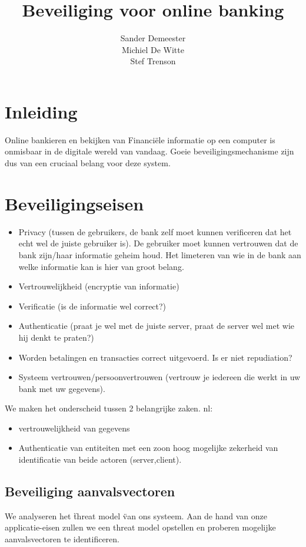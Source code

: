 \documentclass[11pt]{article}
\title{\textbf{Beveiliging voor online banking}}
\author{Sander Demeester\\
		Michiel De Witte\\
		Stef Trenson}
\date{}
\begin{document}
\maketitle

\section{Inleiding}
Online bankieren en bekijken van Financi\"ele informatie op een computer is onmisbaar in de digitale wereld van vandaag. Goeie beveiligingsmechanisme zijn dus van een cruciaal belang voor deze system. 

\section{Beveiligingseisen}
\begin{itemize}
\item Privacy (tussen de gebruikers, de bank zelf moet kunnen verificeren dat het echt wel de juiste gebruiker is). De gebruiker moet kunnen vertrouwen dat de bank zijn/haar informatie geheim houd. Het limeteren van wie in de bank aan welke informatie kan is hier van groot belang.
\item Vertrouwelijkheid (encryptie van informatie)
\item Verificatie (is de informatie wel correct?)
\item Authenticatie (praat je wel met de juiste server, praat de server wel met wie hij denkt te praten?)
\item Worden betalingen en transacties correct uitgevoerd. Is er niet repudiation?
\item Systeem vertrouwen/persoonvertrouwen (vertrouw je iedereen die werkt in uw bank met uw gegevens).
\end{itemize}
We maken het onderscheid tussen 2 belangrijke zaken. nl: 
\begin{itemize}
\item vertrouwelijkheid van gegevens
\item Authenticatie van entiteiten met een zoon hoog mogelijke zekerheid van identificatie van beide actoren (server,client).
\end{itemize}
\subsection{Beveiliging aanvalsvectoren}
We analyseren het \" threat model \" van ons systeem. Aan de hand van onze applicatie-eisen zullen we een threat model opstellen en proberen mogelijke aanvalsvectoren te identificeren.
\end{document}
